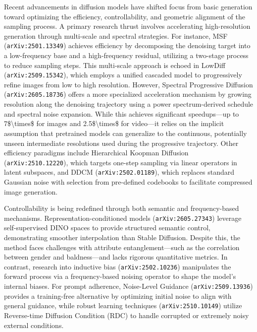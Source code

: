 \documentclass[11pt]{article}
\begin{document}
Recent advancements in diffusion models have shifted focus from basic generation toward optimizing the efficiency, controllability, and geometric alignment of the sampling process. A primary research thrust involves accelerating high-resolution generation through multi-scale and spectral strategies. For instance, MSF (\texttt{arXiv:2501.13349}) achieves efficiency by decomposing the denoising target into a low-frequency base and a high-frequency residual, utilizing a two-stage process to reduce sampling steps. This multi-scale approach is echoed in LowDiff (\texttt{arXiv:2509.15342}), which employs a unified cascaded model to progressively refine images from low to high resolution. However, Spectral Progressive Diffusion (\texttt{arXiv:2605.18736}) offers a more specialized acceleration mechanism by growing resolution along the denoising trajectory using a power spectrum-derived schedule and spectral noise expansion. While this achieves significant speedups—up to 7\$\textbackslash{}times\$ for images and 2.5\$\textbackslash{}times\$ for video—it relies on the implicit assumption that pretrained models can generalize to the continuous, potentially unseen intermediate resolutions used during the progressive trajectory. Other efficiency paradigms include Hierarchical Koopman Diffusion (\texttt{arXiv:2510.12220}), which targets one-step sampling via linear operators in latent subspaces, and DDCM (\texttt{arXiv:2502.01189}), which replaces standard Gaussian noise with selection from pre-defined codebooks to facilitate compressed image generation.

Controllability is being redefined through both semantic and frequency-based mechanisms. Representation-conditioned models (\texttt{arXiv:2605.27343}) leverage self-supervised DINO spaces to provide structured semantic control, demonstrating smoother interpolation than Stable Diffusion. Despite this, the method faces challenges with attribute entanglement—such as the correlation between gender and baldness—and lacks rigorous quantitative metrics. In contrast, research into inductive bias (\texttt{arXiv:2502.10236}) manipulates the forward process via a frequency-based noising operator to shape the model's internal biases. For prompt adherence, Noise-Level Guidance (\texttt{arXiv:2509.13936}) provides a training-free alternative by optimizing initial noise to align with general guidance, while robust learning techniques (\texttt{arXiv:2510.10149}) utilize Reverse-time Diffusion Condition (RDC) to handle corrupted or extremely noisy external conditions.
\end{document}
